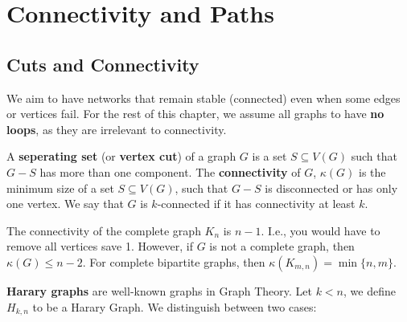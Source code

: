 \chapter{Connectivity and Paths}

\section{Cuts and Connectivity}%
\label{sec:4.1}

We aim to have networks that remain stable (connected) even when some edges or vertices fail. For the rest of this chapter, we assume all graphs to have \textbf{no loops}, as they are irrelevant to connectivity.

A \textbf{seperating set} (or \textbf{vertex cut}) of a graph $G$ is a set $S \subseteq V(G)$ such that $G - S$ has more than one component. The \textbf{connectivity} of $G$, $\kappa(G)$ is the minimum size of a set $S \subseteq V(G)$, such that $G-S$ is disconnected or has only one vertex. We say that $G$ is $k$-connected if it has connectivity at least $k$.

The connectivity of the complete graph $K_{n}$ is $n-1$. I.e., you would have to remove all vertices save 1. However, if $G$ is not a complete graph, then $\kappa(G) \le n-2$. For complete bipartite graphs, then $\kappa(K_{m,n}) = \min\{n,m\}$.

\textbf{Harary graphs} are well-known graphs in Graph Theory. Let $k < n$, we define $H_{k,n}$ to be a Harary Graph. We distinguish between two cases:

